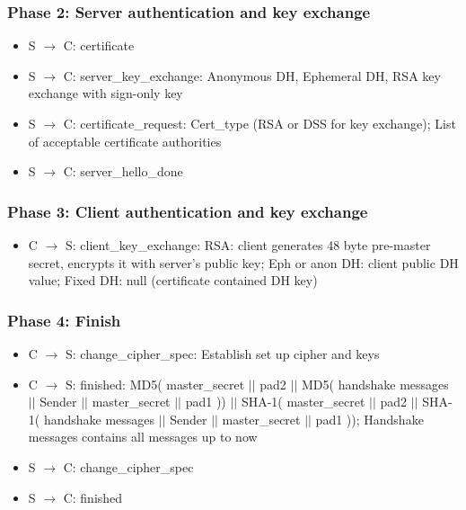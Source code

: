 \documentclass[english, leagacyboxes, nologo]{latex4ei/latex4ei_sheet}
\begin{document}
{    \subsubsection{Phase 2:  Server  authentication    and key exchange}
    \begin{itemize}
      \item S $\rightarrow$ C:  certificate
      \item S $\rightarrow$ C:  server\_key\_exchange: Anonymous DH, Ephemeral   DH, RSA key exchange    with    sign-only   key
      \item S $\rightarrow$ C:  certificate\_request: Cert\_type (RSA    or  DSS for key exchange); List  of  acceptable  certificate  authorities
      \item S $\rightarrow$ C:  server\_hello\_done
    \end{itemize}

    \subsubsection{Phase 3:  Client  authentication and key exchange}
    \begin{itemize}
      \item C $\rightarrow$ S: client\_key\_exchange: RSA: client generates 48  byte pre-master  secret, encrypts it  with server’s
      public  key; Eph or  anon DH: client  public  DH  value; Fixed DH: null (certificate contained DH  key)
    \end{itemize}

    \subsubsection{Phase 4: Finish}
    \begin{itemize}
      \item C $\rightarrow$ S: change\_cipher\_spec: Establish set up cipher and keys
      \item C $\rightarrow$ S: finished: MD5( master\_secret $||$ pad2 $||$ MD5( handshake messages $||$ Sender $||$ master\_secret $||$ pad1 )) $||$ SHA-1( master\_secret $||$ pad2 $||$ SHA-1( handshake messages $||$ Sender $||$ master\_secret $||$ pad1 )); Handshake messages contains all messages up to now
      \item S $\rightarrow$ C: change\_cipher\_spec
      \item S $\rightarrow$ C: finished
    \end{itemize}
  }
\end{document}
